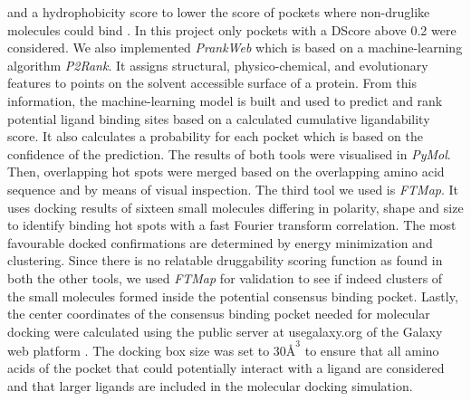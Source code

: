 \documentclass[11pt, letterpaper, titlepage]{article}
\renewcommand{\cite}{\parencite}
\begin{document}
and a hydrophobicity score to lower the score of pockets where non-druglike molecules could bind \cite{Ricci_2022}. In this project only pockets with a \ac{DScore} above 0.2 were considered. 
We also implemented \textit{PrankWeb} \cite{package_P2Rank, package_PrankWeb, package_PrankWeb3} which is based on a machine-learning algorithm \textit{P2Rank}. It assigns structural, physico-chemical, and evolutionary features to points on the solvent accessible surface of a protein. From this information, the machine-learning model is built and used to predict and rank potential ligand binding sites based on a calculated cumulative ligandability score. It also calculates a probability for each pocket which is based on the confidence of the prediction.
The results of both tools were visualised in \textit{PyMol}. Then, overlapping hot spots were merged based on the overlapping amino acid sequence and by means of visual inspection.
The third tool we used is \textit{FTMap}. It uses docking results of sixteen small molecules differing in polarity, shape and size to identify binding hot spots with a fast Fourier transform correlation. The most favourable docked confirmations are determined by energy minimization and clustering. Since there is no relatable druggability scoring function as found in both the other tools, we used \textit{FTMap} for validation to see if indeed clusters of the small molecules formed inside the potential consensus binding pocket.
Lastly, the center coordinates of the consensus binding pocket needed for molecular docking were calculated using the public server at usegalaxy.org of the Galaxy web platform \cite{galaxy}. The docking box size was set to $30 \si{\angstrom}^3$ to ensure that all amino acids of the pocket that could potentially interact with a ligand are considered and that larger ligands are included in the molecular docking simulation.
\end{document}
